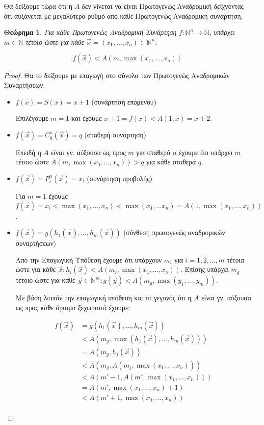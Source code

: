 \documentclass[a4paper, oneside, 11pt]{article}
\newtheorem{thm}{Θεώρημα}
\theoremstyle{definition}
\newcommand{\ora}{\vec}
\begin{document}
Θα δείξουμε τώρα ότι η $A$ δεν γίνεται να είναι Πρωτογενώς Αναδρομική δείχνοντας
ότι αυξάνεται με μεγαλύτερο ρυθμό από κάθε Πρωτογενώς Αναδρομική συνάρτηση.

\begin{thm}
\label{thm5}
Για κάθε Πρωτογενώς Αναδρομική Συνάρτηση $f : \mathbb{N}^n \rightarrow
\mathbb{N}$, υπάρχει $m \in \mathbb{N}$ τέτοιο
ώστε για κάθε $\ora{x} = (x_1, \ldots, x_n) \in \mathbb{N}^n$:

\[ f(\ora{x}) < A(m, \max(x_1, \ldots, x_n) ) \]
\end{thm}

\begin{proof}
Θα το δείξουμε με επαγωγή στο σύνολο των Πρωτογενώς Αναδρομικών Συναρτήσεων:

\begin{itemize}
\item $f(x) = S(x) = x+1$ (συνάρτηση επόμενου)

Επιλέγουμε $m = 1$ και έχουμε $x+1 = f(x) < A(1, x) = x+2$.

\item $f(\ora{x}) = C_q^n(\ora{x}) = q$ (σταθερή συνάρτηση)

Επειδή η $A$ είναι γν. αύξουσα ως προς $m$ για σταθερό $n$ έχουμε ότι υπάρχει
$m$ τέτοιο ώστε $A(m, \max(x_1, \ldots, x_n)) > q$ για κάθε σταθερά $q$.

\item $f(\ora{x}) = P_i^n(\ora{x}) = x_i$ (συνάρτηση προβολής)

Για $m=1$ έχουμε $f(\ora{x}) = x_i < \max(x_1, \ldots, x_n) < \max(x_1, \ldots
x_n) = A(1, \max(x_1, \ldots, x_n))$.

\item $f(\ora{x}) = g(h_1(\ora{x}), \ldots, h_m(\ora{x}))$ (σύνθεση πρωτογενώς
αναδρομικών συναρτήσεων)

Από την Επαγωγική Υπόθεση έχουμε ότι υπάρχουν $m_i$ για $i = 1, 2, \ldots, m$
τέτοια ώστε για κάθε $\ora{x}: h_i(\ora{x}) < A(m_i, \max(x_1, \ldots, x_n))$.
Επίσης υπάρχει $m_g$ τέτοιο ώστε για κάθε $\ora{y} \in \mathbb{N}^m: g(\ora{y})
< A(m_g, \max(y_1, \ldots, y_m))$.

Με βάση λοιπόν την επαγωγική υπόθεση και το γεγονός ότι η $A$ είναι γν. αύξουσα
ως προς κάθε όρισμα ξεχωριστά έχουμε:

\begin{align*}
   f(\ora{x}) &= g(h_1(\ora{x}), \ldots, h_m(\ora{x}))\\
              &< A(m_g, \max(h_1(\ora{x}), \ldots, h_m(\ora{x})))\\
              &= A(m_g, h_j(\ora{x}))\\
              &< A(m_g, A(m_j, \max(x_1, \ldots, x_n)))\\
              &< A(m'-1, A(m', \max(x_1, \ldots, x_n)))\\
              &= A(m', \max(x_1, \ldots, x_n)+1)\\
              &< A(m'+1, \max(x_1, \ldots, x_n))\\
\end{align*}


\end{itemize}
\end{proof}
\end{document}

